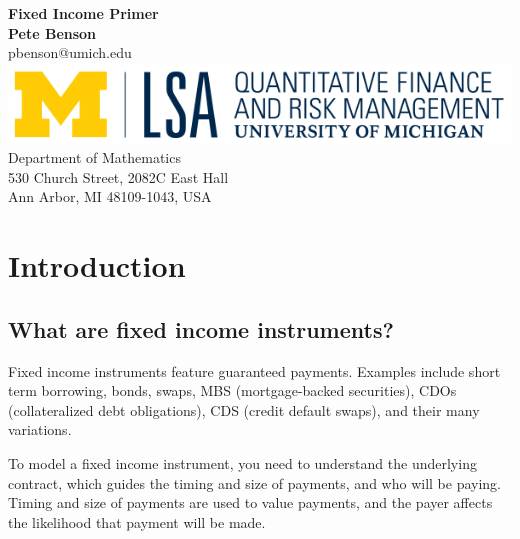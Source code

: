 \documentclass{report}
\numberwithin{problem}{chapter} %
\begin{document}
\begin{titlepage}
\begin{center}
 {\huge\bfseries Fixed Income Primer\\}
 \vspace{1.5cm}
 {\bfseries Pete Benson}\\[5pt]
 pbenson@umich.edu\\[14pt]
 \vspace{10cm}
\includegraphics{QFRM_rgb}\\[5pt]
{Department of Mathematics}\\[5pt]
{530 Church Street, 2082C East Hall}\\[5pt]
{Ann Arbor, MI 48109-1043,
 USA}\\
 \vfill

\end{center}
\end{titlepage}

\tableofcontents
\newpage

\chapter{Introduction}

\section{What are fixed income instruments?}
Fixed income instruments feature guaranteed payments. Examples include short term borrowing, bonds, swaps, MBS (mortgage-backed securities), CDOs (collateralized debt obligations), CDS (credit default swaps), and their many variations.

To model a fixed income instrument, you need to understand the underlying contract, which guides the timing and size of payments, and who will be paying. Timing and size of payments are used to value payments, and the payer affects the likelihood that payment will be made.
\end{document}
